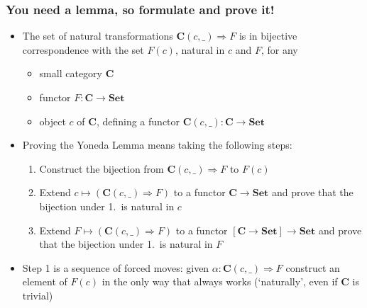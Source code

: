 \documentclass[handout]{beamer}
\newcommand{\To}{\Rightarrow}
\newcommand{\bfsf}[1]{{\boldsymbol{#1}}}
\newcommand{\Set}{\bfsf{Set}}
\newcommand{\CC}{\bfsf{C}}
\begin{document}
\frame
  {   
    \frametitle{You need a lemma, so formulate and prove it!}\label{Yon:Intro}

 \begin{itemize}[<+->]
\item The set of natural transformations $\CC(c,\_)\To F$ is in bijective
correspondence with the set $F(c)$, natural in $c$ and $F$, for any
\begin{itemize}
    \item small category $\CC$
    \item functor $F:\CC\to\Set$
    \item object $c$ of $\CC$, defining a functor $\CC(c,\_):\CC\to\Set$
 \end{itemize}
\item Proving the Yoneda Lemma means taking the following steps:
 \begin{enumerate}
    \item Construct the bijection from $\CC(c,\_)\To F$ to $F(c)$
    \item Extend $c\mapsto(\CC(c,\_)\To F)$ to a functor $\CC\to\Set$ and
prove that the bijection under 1.\ is natural in $c$
    \item Extend $F\mapsto(\CC(c,\_)\To F)$ to a functor $[\CC\to\Set]\to\Set$ and
prove that the bijection under 1.\ is natural in $F$
   \end{enumerate}
\item Step 1 is a sequence of forced moves: given $\alpha: \CC(c,\_)\To F$
construct an element of  $F(c)$ in the only way that always works (`naturally',
even if $\CC$ is trivial)
 \end{itemize}

 }
\end{document}
